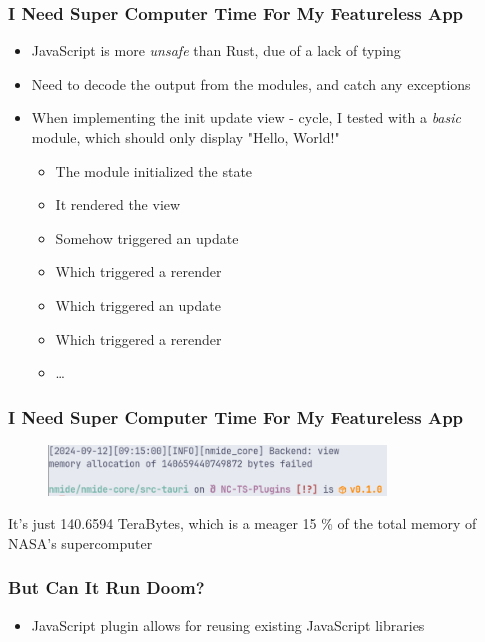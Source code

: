 \begin{frame}
  \frametitle{I Need Super Computer Time For My Featureless App}
  \begin{itemize}
    \item JavaScript is more \textit{unsafe} than Rust, due of a lack of typing
    \item Need to decode the output from the modules, and catch any exceptions
    \item When implementing the init \to update \to view - cycle, I tested with
      a \textit{basic} module, which should only display "Hello, World!"
      \begin{itemize}
        \item The module initialized the state
        \item It rendered the view
        \item Somehow triggered an update
        \item Which triggered a rerender
        \item Which triggered an update
        \item Which triggered a rerender
        \item \dots
      \end{itemize}
  \end{itemize}
\end{frame}

\begin{frame}
  \frametitle{I Need Super Computer Time For My Featureless App}
  \begin{figure}
    \centering
    \includegraphics[width=0.8\textwidth]{./pics/memory-allocation-zoomed.png}
  \end{figure}
  It's just 140.6594 TeraBytes, which is a meager 15 \% of the total memory of NASA's
  supercomputer
\end{frame}

\begin{frame}
  \frametitle{But Can It Run Doom?}
  \begin{itemize}
    \item JavaScript plugin allows for reusing existing JavaScript libraries
  \end{itemize}
\end{frame}

